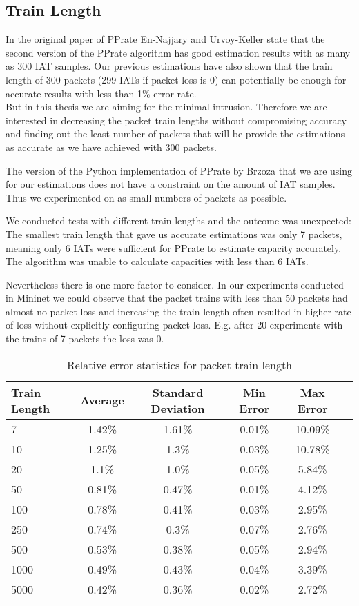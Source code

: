 \subsection{Train Length}
In the original paper of PPrate\cite{pprate2006} En-Najjary and Urvoy-Keller state that the second version of the PPrate algorithm has good estimation results with as many as 300 IAT samples. Our previous estimations have also shown that the train length of 300 packets (299 IATs if packet loss is 0) can potentially be enough for accurate results with less than 1\% error rate.\\ But in this thesis we are aiming for the minimal intrusion. Therefore we are interested in decreasing the packet train lengths without compromising accuracy and finding out the least number of packets that will be provide the estimations as accurate as we have achieved with 300 packets.

The version of the Python implementation of PPrate by Brzoza\cite{Brzoza} that we are using for our estimations does not have a constraint on the amount of IAT samples. Thus we experimented on as small numbers of packets as possible. 

We conducted tests with different train lengths and the outcome was unexpected: The smallest train length that gave us accurate estimations was only 7 packets, meaning only 6 IATs were sufficient for PPrate to estimate capacity accurately. The algorithm was unable to calculate capacities with less than 6 IATs.  

Nevertheless there is one more factor to consider. In our experiments conducted in Mininet we could observe that the packet trains with less than 50 packets had almost no packet loss and increasing the train length often resulted in higher rate of loss without explicitly configuring packet loss. E.g. after 20 experiments with the trains of 7 packets the loss was 0.  

\begin{table}[h!]
  \centering
  \caption{Relative error statistics for packet train length}
  \label{train_length_error_stats}
\begin{tabular}{l|c|c|c|c|c}
\toprule
 Train Length & Average & Standard Deviation & Min Error & Max Error \\ \midrule
  \label{}
    7 & 1.42\% & 1.61\% & 0.01\% & 10.09\% \\
    10 & 1.25\% & 1.3\% & 0.03\% & 10.78\% \\
    20 & 1.1\% & 1.0\% & 0.05\% & 5.84\% \\
    50 & 0.81\% & 0.47\% & 0.01\% & 4.12\% \\
    100 & 0.78\% & 0.41\% & 0.03\% & 2.95\% \\
    250 & 0.74\% & 0.3\% & 0.07\% & 2.76\% \\ 
    500 & 0.53\% & 0.38\% & 0.05\% & 2.94\% \\
    1000 & 0.49\% & 0.43\% & 0.04\% & 3.39\% \\
    5000 & 0.42\% & 0.36\% & 0.02\% & 2.72\% \\ \bottomrule
  \end{tabular}      
\end{table}

